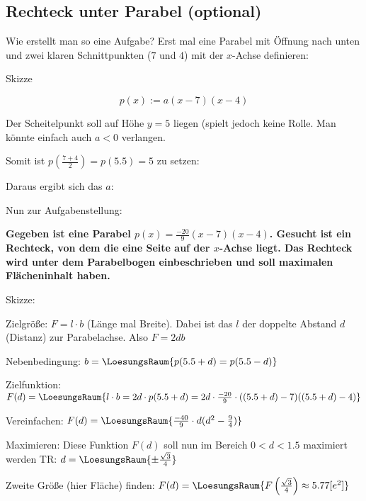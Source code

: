 \subsection{Rechteck unter Parabel (optional)}

Wie erstellt man so eine Aufgabe? Erst mal eine Parabel mit Öffnung nach unten und zwei klaren Schnittpunkten (\zB $7$ und $4$) mit der $x$-Achse definieren:

Skizze


$$p(x) := a(x-7)(x-4)$$

Der Scheitelpunkt soll auf Höhe $y=5$ liegen (spielt jedoch keine Rolle. Man könnte einfach auch $a<0$ verlangen.

Somit ist $p(\frac{7+4}2) = p(5.5) = 5$ zu setzen:



Daraus ergibt sich das $a$:

\newpage

Nun zur Aufgabenstellung:

\textbf{Gegeben ist eine Parabel $p(x) = \frac{-20}9(x-7)(x-4)$. Gesucht ist ein Rechteck, von dem die eine Seite auf der $x$-Achse liegt. Das Rechteck wird unter dem Parabelbogen einbeschrieben und soll maximalen Flächeninhalt haben.}

Skizze:


Zielgröße: $F = l\cdot{}b$ (Länge mal Breite). Dabei ist das $l$ der doppelte Abstand $d$ (Distanz) zur Parabelachse.
Also $F = 2db$

Nebenbedingung: $b = \LoesungsRaum{p(5.5 + d) = p(5.5-d)}$

Zielfunktion: $F(d) = \LoesungsRaum{l\cdot{}b = 2d\cdot{}p(5.5+d) = 2d\cdot{}\frac{-20}9\cdot((5.5+d)-7)((5.5+d)-4)}$

Vereinfachen:
$F(d) = \LoesungsRaum{\frac{-40}9\cdot{}d(d^2-\frac94)}$

Maximieren: Diese Funktion $F(d)$ soll nun im Bereich $0<d<1.5$ maximiert werden TR: $d = \LoesungsRaum{\pm\frac{\sqrt{3}}4}$

Zweite Größe (hier Fläche) finden: $F(d) = \LoesungsRaum{F\left(\frac{\sqrt{3}}4\right) \approx 5.77 [e^2]}$

